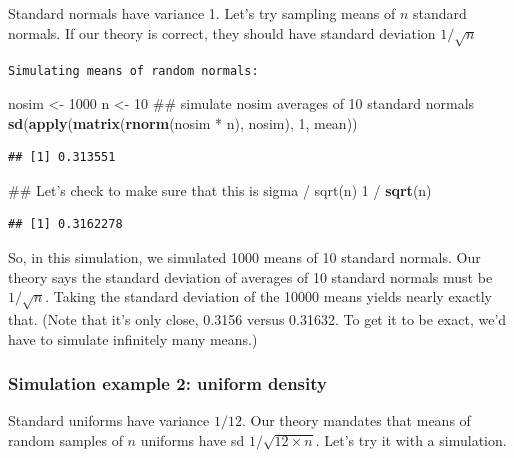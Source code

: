 \documentclass[]{article}
\newenvironment{Shaded}{\begin{snugshade}}{\end{snugshade}}
\newcommand{\KeywordTok}[1]{\textcolor[rgb]{0.13,0.29,0.53}{\textbf{{#1}}}}
\newcommand{\DecValTok}[1]{\textcolor[rgb]{0.00,0.00,0.81}{{#1}}}
\newcommand{\StringTok}[1]{\textcolor[rgb]{0.31,0.60,0.02}{{#1}}}
\newcommand{\NormalTok}[1]{{#1}}
\begin{document}
Standard normals have variance 1. Let's try sampling means of $n$
standard normals. If our theory is correct, they should have standard
deviation $1/\sqrt{n}$

\vspace{1pc}

\verb;Simulating means of random normals:;

\begin{Shaded}
\begin{Highlighting}[]
\NormalTok{nosim <-}\StringTok{ }\DecValTok{1000}
\NormalTok{n <-}\StringTok{ }\DecValTok{10}
\NormalTok{## simulate nosim averages of 10 standard normals}
\KeywordTok{sd}\NormalTok{(}\KeywordTok{apply}\NormalTok{(}\KeywordTok{matrix}\NormalTok{(}\KeywordTok{rnorm}\NormalTok{(nosim *}\StringTok{ }\NormalTok{n), nosim), }\DecValTok{1}\NormalTok{, mean))}
\end{Highlighting}
\end{Shaded}

\begin{verbatim}
## [1] 0.313551
\end{verbatim}

\begin{Shaded}
\begin{Highlighting}[]
\NormalTok{## Let's check to make sure that this is sigma / sqrt(n)}
\DecValTok{1} \NormalTok{/}\StringTok{ }\KeywordTok{sqrt}\NormalTok{(n)}
\end{Highlighting}
\end{Shaded}

\begin{verbatim}
## [1] 0.3162278
\end{verbatim}

So, in this simulation, we simulated 1000 means of 10 standard normals.
Our theory says the standard deviation of averages of 10 standard
normals must be $1/\sqrt{n}$. Taking the standard deviation of the 10000
means yields nearly exactly that. (Note that it's only close, 0.3156
versus 0.31632. To get it to be exact, we'd have to simulate infinitely
many means.)

\subsubsection{Simulation example 2: uniform
density}\label{simulation-example-2-uniform-density}

Standard uniforms have variance $1/12$. Our theory mandates that means
of random samples of $n$ uniforms have sd $1/\sqrt{12 \times n}$. Let's
try it with a simulation.
\end{document}
